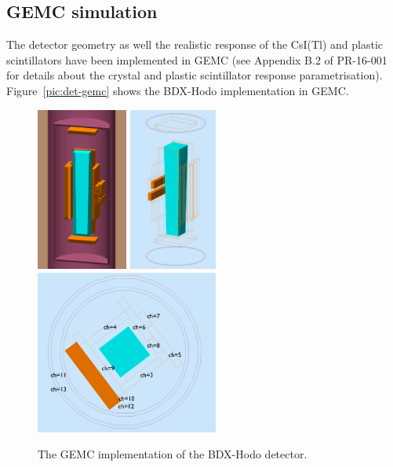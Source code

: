 \subsection{GEMC simulation}
The  detector geometry as well the realistic response of the CsI(Tl) and plastic scintillators have been implemented in GEMC (see  Appendix B.2 of PR-16-001~\cite{bdx-proposal} for details about the crystal and plastic scintillator response parametrisation). Figure~\ref{pic:det-gemc} shows the BDX-Hodo implementation in GEMC.
\begin{figure}[h!] 
\center
\includegraphics[width=2.99cm]{figs/gemc-3d.pdf}  
\includegraphics[width=2.9cm]{figs/gemc-3d1.pdf}  
\includegraphics[width=6.0cm]{figs/gemc-3d2.pdf}  
\caption{The GEMC  implementation of the BDX-Hodo detector.}
\label{fig:det-gemc}
\end{figure}
